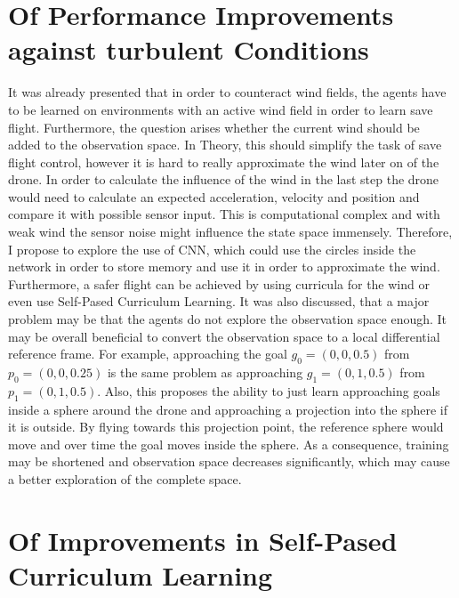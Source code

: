 \section{Of Performance Improvements against turbulent Conditions}
It was already presented that in order to counteract wind fields, the agents have to be learned
on environments with an active wind field in order to learn save flight.
Furthermore, the question arises whether the current wind should be added to the observation space.
In Theory, this should simplify the task of save flight control, however it is hard 
to really approximate the wind later on of the drone. In order to calculate the influence 
of the wind in the last step the drone would need to calculate an expected acceleration, velocity and position 
and compare it with possible sensor input. This is computational complex and
with weak wind the sensor noise might influence the state space immensely.
Therefore, I propose to explore the use of CNN, which could use the circles inside the network in order 
to store memory and use it in order to approximate the wind.
Furthermore, a safer flight can be achieved by using curricula for the wind or even use 
Self-Pased Curriculum Learning.
It was also discussed, that a major problem may be that the agents do not explore the 
observation space enough.
It may be overall beneficial to convert the observation space to a local differential reference frame.
For example, approaching the goal $g_0 = (0, 0, 0.5)$ from $p_0 = (0, 0, 0.25)$ 
is the same problem as approaching $g_1 = (0,1, 0.5)$ from $p_1 = (0, 1, 0.5)$.
Also, this proposes the ability to just learn approaching goals inside a sphere around the drone 
and approaching a projection into the sphere if it is outside. By flying towards 
this projection point, the reference sphere would move and over time the goal moves inside the sphere.
As a consequence, training may be shortened and observation space decreases significantly, which 
may cause a better exploration of the complete space.

\section{Of Improvements in Self-Pased Curriculum Learning}

\newpage

